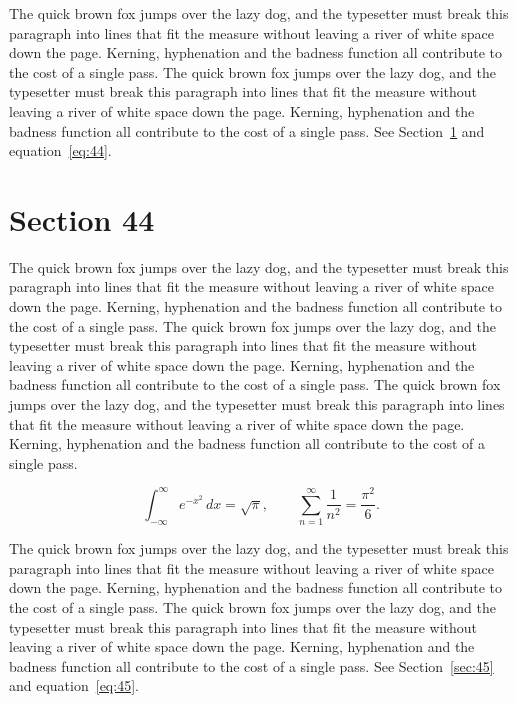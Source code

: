 \documentclass{article}
\begin{document}
The quick brown fox jumps over the lazy dog, and the typesetter must break this paragraph into lines that fit the measure without leaving a river of white space down the page. Kerning, hyphenation and the badness function all contribute to the cost of a single pass. The quick brown fox jumps over the lazy dog, and the typesetter must break this paragraph into lines that fit the measure without leaving a river of white space down the page. Kerning, hyphenation and the badness function all contribute to the cost of a single pass. 
See Section~\ref{sec:44} and equation~\eqref{eq:44}.
\section{Section 44}
\label{sec:44}
The quick brown fox jumps over the lazy dog, and the typesetter must break this paragraph into lines that fit the measure without leaving a river of white space down the page. Kerning, hyphenation and the badness function all contribute to the cost of a single pass. The quick brown fox jumps over the lazy dog, and the typesetter must break this paragraph into lines that fit the measure without leaving a river of white space down the page. Kerning, hyphenation and the badness function all contribute to the cost of a single pass. The quick brown fox jumps over the lazy dog, and the typesetter must break this paragraph into lines that fit the measure without leaving a river of white space down the page. Kerning, hyphenation and the badness function all contribute to the cost of a single pass. 

\begin{equation}\label{eq:44}
\int_{-\infty}^{\infty} e^{-x^{2}}\,dx = \sqrt{\pi}, \qquad
\sum_{n=1}^{\infty} \frac{1}{n^{2}} = \frac{\pi^{2}}{6}.
\end{equation}

The quick brown fox jumps over the lazy dog, and the typesetter must break this paragraph into lines that fit the measure without leaving a river of white space down the page. Kerning, hyphenation and the badness function all contribute to the cost of a single pass. The quick brown fox jumps over the lazy dog, and the typesetter must break this paragraph into lines that fit the measure without leaving a river of white space down the page. Kerning, hyphenation and the badness function all contribute to the cost of a single pass. 
See Section~\ref{sec:45} and equation~\eqref{eq:45}.
\end{document}
